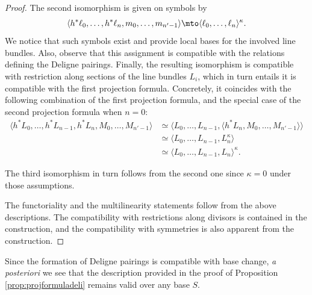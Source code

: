 \begin{proof}
The second isomorphism is given on symbols by
\begin{equation}\label{eq:explicit-second-projection-formula}
\langle h^{\ast} \ell_{0},\ldots, h^{\ast}\ell_{n},m_{0},\ldots, m_{n^{\prime}-1}\rangle\mto \langle \ell_{0},\ldots,\ell_{n} \rangle^{\kappa}.
\end{equation}
We notice that such symbols exist and provide local bases for the involved line bundles. Also, observe that this assignment is compatible with the relations defining the Deligne pairings. Finally, the resulting isomorphism is compatible with restriction along sections of the line bundles $L_{i}$, which in turn entails it is compatible with the first projection formula. Concretely, it coincides with the following combination of the first projection formula, and the special case of the second projection formula when $n=0$:
\begin{displaymath}
\begin{split}
\langle h^\ast L_0, \ldots, h^\ast L_{n-1}, h^\ast L_n, M_0, \ldots, M_{n'-1} \rangle & \simeq \langle L_0, \ldots, L_{n-1}, \langle h^\ast L_n, M_0, \ldots, M_{n'-1} \rangle \rangle \\
& \simeq \langle L_0, \ldots, L_{n-1}, L_n^{\kappa} \rangle \\
& \simeq \langle L_0, \ldots, L_{n-1}, L_n \rangle^{\kappa}.
\end{split}
\end{displaymath}

The third isomorphism in turn follows from the second one since $\kappa = 0$ under those assumptions.

The functoriality and the multilinearity statements follow from the above descriptions. The compatibility with restrictions along divisors is contained in the construction, and the compatibility with symmetries is also apparent from the construction.
\end{proof}

\begin{remark}
Since the formation of Deligne pairings is compatible with base change, \emph{a posteriori} we see that the description provided in the proof of Proposition \ref{prop:projformuladeli} remains valid over any base $S$.
\end{remark}

